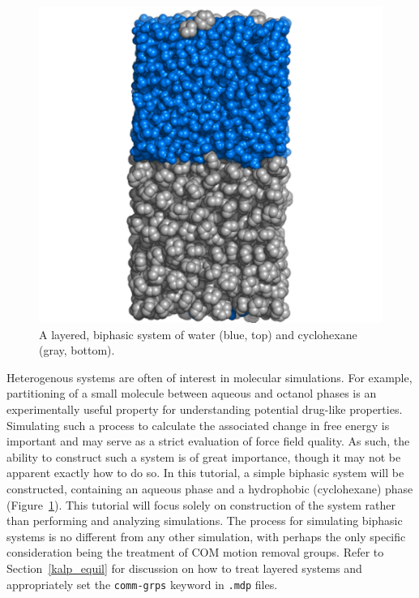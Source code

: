 \documentclass[9pt,tutorial,pubversion]{livecoms}
\begin{document}
\begin{figure}[H]
\centering
\includegraphics{biphasic_system}
\caption{A layered, biphasic system of water (blue, top) and cyclohexane (gray, bottom).}
\label{biphasic_system_fig}
\end{figure}

Heterogenous systems are often of interest in molecular simulations. For example, partitioning of a small molecule between aqueous and octanol phases is an experimentally useful property for understanding potential drug-like properties. Simulating such a process to calculate the associated change in free energy is important and may serve as a strict evaluation of force field quality. As such, the ability to construct such a system is of great importance, though it may not be apparent exactly how to do so. In this tutorial, a simple biphasic system will be constructed, containing an aqueous phase and a hydrophobic (cyclohexane) phase (Figure~\ref{biphasic_system_fig}). This tutorial will focus solely on construction of the system rather than performing and analyzing simulations. The process for simulating biphasic systems is no different from any other simulation, with perhaps the only specific consideration being the treatment of COM motion removal groups. Refer to Section~\ref{kalp_equil} for discussion on how to treat layered systems and appropriately set the \texttt{comm-grps} keyword in \texttt{.mdp} files.
\end{document}
